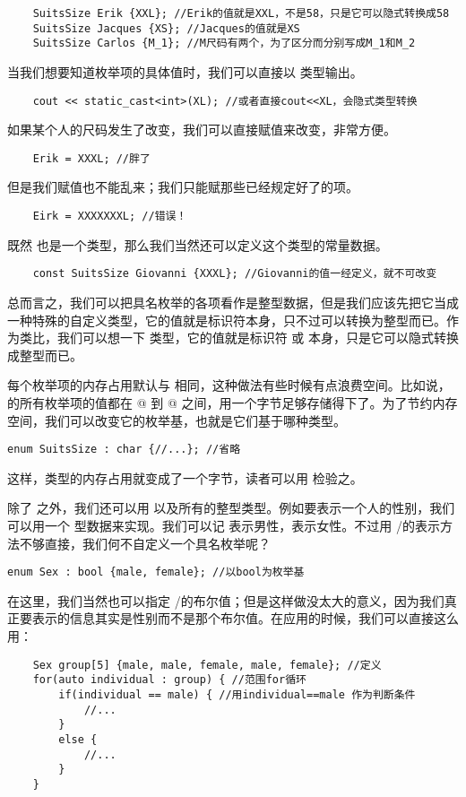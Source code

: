 \begin{lstlisting}
    SuitsSize Erik {XXL}; //Erik的值就是XXL，不是58，只是它可以隐式转换成58
    SuitsSize Jacques {XS}; //Jacques的值就是XS
    SuitsSize Carlos {M_1}; //M尺码有两个，为了区分而分别写成M_1和M_2
\end{lstlisting}\par
当我们想要知道枚举项的具体值时，我们可以直接以 \lstinline@int@ 类型输出。
\begin{lstlisting}
    cout << static_cast<int>(XL); //或者直接cout<<XL，会隐式类型转换
\end{lstlisting}\par
如果某个人的尺码发生了改变，我们可以直接赋值来改变，非常方便。
\begin{lstlisting}
    Erik = XXXL; //胖了
\end{lstlisting}
但是我们赋值也不能乱来；我们只能赋那些已经规定好了的项。
\begin{lstlisting}
    Eirk = XXXXXXXL; //错误！
\end{lstlisting}
既然 \lstinline@SuitsSize@ 也是一个类型，那么我们当然还可以定义这个类型的常量数据。
\begin{lstlisting}
    const SuitsSize Giovanni {XXXL}; //Giovanni的值一经定义，就不可改变
\end{lstlisting}\par
总而言之，我们可以把具名枚举的各项看作是整型数据，但是我们应该先把它当成一种特殊的自定义类型，它的值就是标识符本身，只不过可以转换为整型而已。作为类比，我们可以想一下 \lstinline@bool@ 类型，它的值就是标识符 \lstinline@true@ 或 \lstinline@false@ 本身，只是它可以隐式转换成整型而已。\par
每个枚举项的内存占用默认与 \lstinline@int@ 相同，这种做法有些时候有点浪费空间。比如说，\lstinline@SuitsSize@ 的所有枚举项的值都在 @ 到 @ 之间，用一个字节足够存储得下了。为了节约内存空间，我们可以改变它的枚举基，也就是它们基于哪种类型。
\begin{lstlisting}
enum SuitsSize : char {//...}; //省略
\end{lstlisting}
这样，\lstinline@SuitsSize@ 类型的内存占用就变成了一个字节，读者可以用 \lstinline@sizeof@ 检验之。\par
除了 \lstinline@char@ 之外，我们还可以用 \lstinline@bool@ 以及所有的整型类型。例如要表示一个人的性别，我们可以用一个 \lstinline@bool@ 型数据来实现。我们可以记 \lstinline@true@ 表示男性，\lstinline@false@ 表示女性。不过用 \lstinline@true@/\lstinline@false@ 的表示方法不够直接，我们何不自定义一个具名枚举呢？
\begin{lstlisting}
enum Sex : bool {male, female}; //以bool为枚举基
\end{lstlisting}
在这里，我们当然也可以指定 \lstinline@male@/\lstinline@female@ 的布尔值；但是这样做没太大的意义，因为我们真正要表示的信息其实是性别而不是那个布尔值。在应用的时候，我们可以直接这么用：
\begin{lstlisting}
    Sex group[5] {male, male, female, male, female}; //定义
    for(auto individual : group) { //范围for循环
        if(individual == male) { //用individual==male 作为判断条件
            //...
        }
        else {
            //...
        }
    }
\end{lstlisting}
